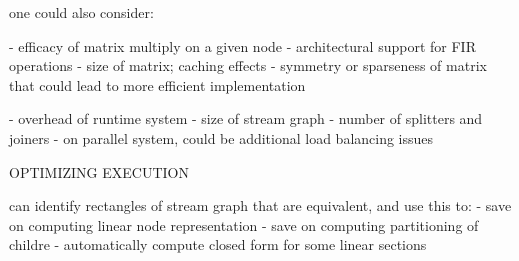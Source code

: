 one could also consider:

  - efficacy of matrix multiply on a given node
    - architectural support for FIR operations
    - size of matrix; caching effects
    - symmetry or sparseness of matrix that could lead to more efficient implementation

  - overhead of runtime system
    - size of stream graph
    - number of splitters and joiners
    - on parallel system, could be additional load balancing issues

OPTIMIZING EXECUTION

can identify rectangles of stream graph that are equivalent, and use this to:
 - save on computing linear node representation
 - save on computing partitioning of childre
 - automatically compute closed form for some linear sections

